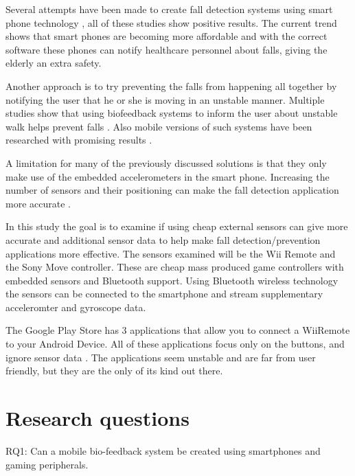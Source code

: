 \documentclass[11pt,twoside,a4paper]{report}
\begin{document}
Several attempts have been made to create fall detection systems using smart phone technology \cite{iFall, semiSupervisedFallDetection, mobilePhoneBasedFallDetection, detectionOfFalls}, all of these studies show positive results. The current trend shows that smart phones are becoming more affordable \cite{find_some_data_here} and with the correct software these phones can notify healthcare personnel about falls, giving the elderly an extra safety.

Another approach is to try preventing the falls from happening all together by notifying the user that he or she is moving in an unstable manner. Multiple studies show that using biofeedback systems to inform the user about unstable walk helps prevent falls \cite{multiModualBiofeedback, vibrotactileBiofeedback, vibrotactileTiltFeedback}. %
Also mobile versions of such systems have been researched with promising results \cite{fallPrevention}.

A limitation for many of the previously discussed solutions is that they only make use of the embedded accelerometers in the smart phone. Increasing the number of sensors and their positioning can make the fall detection application more accurate \cite{fallDetectionWithExtraSensors}.

In this study the goal is to examine if using cheap external sensors can give more accurate and additional sensor data to help make fall detection/prevention applications more effective. The sensors examined will be the Wii Remote and the Sony Move controller. These are cheap mass produced game controllers with embedded sensors and Bluetooth support. Using Bluetooth wireless technology the sensors can be connected to the smartphone and stream supplementary acceleromter and gyroscope data.

The Google Play Store has 3 applications that allow you to connect a WiiRemote to your Android Device. All of these applications focus only on the buttons, and ignore sensor data \cite{wiimoteController, simpleWiiController}. The applications seem unstable and are far from user friendly, but they are the only of its kind out there.

\section{Research questions}
RQ1: Can a mobile bio-feedback system be created using smartphones and gaming peripherals.
\end{document}

